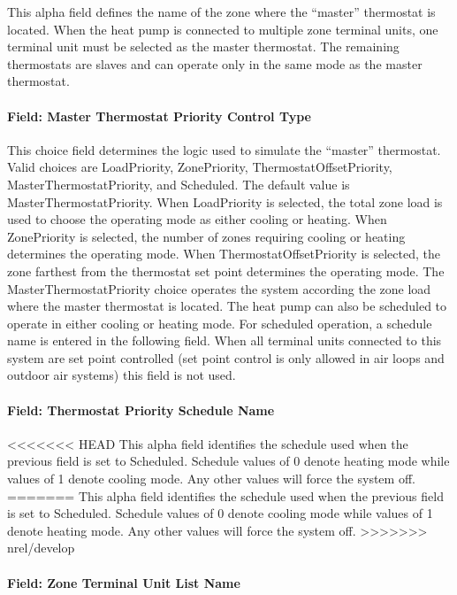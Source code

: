This alpha field defines the name of the zone where the ``master'' thermostat is located. When the heat pump is connected to multiple zone terminal units, one terminal unit must be selected as the master thermostat. The remaining thermostats are slaves and can operate only in the same mode as the master thermostat.

\paragraph{Field: Master Thermostat Priority Control Type}\label{field-master-thermostat-priority-control-type-000}

This choice field determines the logic used to simulate the ``master'' thermostat. Valid choices are LoadPriority, ZonePriority, ThermostatOffsetPriority, MasterThermostatPriority, and Scheduled. The default value is MasterThermostatPriority. When LoadPriority is selected, the total zone load is used to choose the operating mode as either cooling or heating. When ZonePriority is selected, the number of zones requiring cooling or heating determines the operating mode. When ThermostatOffsetPriority is selected, the zone farthest from the thermostat set point determines the operating mode. The MasterThermostatPriority choice operates the system according the zone load where the master thermostat is located. The heat pump can also be scheduled to operate in either cooling or heating mode. For scheduled operation, a schedule name is entered in the following field. When all terminal units connected to this system are set point controlled (set point control is only allowed in air loops and outdoor air systems) this field is not used.

\paragraph{Field: Thermostat Priority Schedule Name}\label{field-thermostat-priority-schedule-name-000}

<<<<<<< HEAD
This alpha field identifies the schedule used when the previous field is set to Scheduled. Schedule values of 0 denote heating mode while values of 1 denote cooling mode. Any other values will force the system off.
=======
This alpha field identifies the schedule used when the previous field is set to Scheduled. Schedule values of 0 denote cooling mode while values of 1 denote heating mode. Any other values will force the system off.
>>>>>>> nrel/develop

\paragraph{Field: Zone Terminal Unit List Name}\label{field-zone-terminal-unit-list-name}

